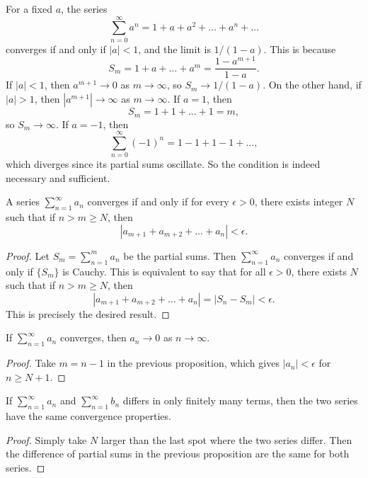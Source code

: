 \begin{example}
  For a fixed $a$, the series
  \[
    \sum_{n = 0}^\infty a^n = 1 + a + a^2 + \dots + a^n + \dots
  \]
  converges if and only
  if $|a| < 1$, and the limit is $1 / (1 - a)$. This is
  because
  \[
    S_m = 1 + a + \dots + a^m
    = \frac{1 - a^{m + 1}}{1 - a}.
  \]
  If $|a| < 1$, then $a^{m + 1} \to 0$ as $m \to \infty$,
  so $S_m \to 1 / (1 - a)$. On the other hand,
  if $|a| > 1$, then $|a^{m + 1}| \to \infty$ as $m \to \infty$.
  If $a = 1$, then
  \[
    S_m = 1 + 1 + \dots + 1 = m,
  \]
  so $S_m \to \infty$. If $a = -1$, then
  \[
    \sum_{n = 0}^\infty (-1)^n = 1 - 1 + 1 - 1 + \dots,
  \]
  which diverges since its partial sums
  oscillate. So the condition
  is indeed necessary and sufficient.
\end{example}

\begin{prop}
  A series
  $\sum_{n = 1}^\infty a_n$
  converges if and only if for every $\epsilon > 0$,
  there exists integer $N$ such that if $n > m \ge N$,
  then
  \[|a_{m + 1} + a_{m + 2} + \dots + a_n| < \epsilon.\]
\end{prop}

\begin{proof}
  Let $S_m = \sum_{n = 1}^m a_n$ be the partial
  sums. Then $\sum_{n = 1}^\infty a_n$ converges
  if and only if $\{S_m\}$ is Cauchy. This is equivalent
  to say that for
  all $\epsilon > 0$, there exists $N$ such that if
  $n > m \ge N$, then
  \[
    |a_{m + 1} + a_{m + 2} + \dots + a_n|
    = |S_n - S_m| < \epsilon.
  \]
  This is precisely the desired result.
\end{proof}

\begin{corollary}
  If $\sum_{n = 1}^\infty a_n$ converges, then
  $a_n \to 0$ as $n \to \infty$.
\end{corollary}

\begin{proof}
  Take $m = n - 1$ in the previous proposition, which
  gives $|a_n| < \epsilon$ for $n \ge N + 1$.
\end{proof}

\begin{corollary}
  If $\sum_{n = 1}^\infty a_n$ and $\sum_{n = 1}^\infty b_n$
  differs in only finitely many terms, then the
  two series have the same convergence properties.
\end{corollary}

\begin{proof}
  Simply take $N$ larger than the last spot where
  the two series differ. Then the difference of
  partial sums in the previous proposition are the same
  for both series.
\end{proof}

